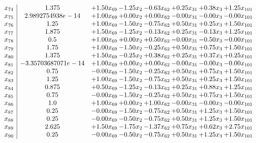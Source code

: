 \documentclass[8pt]{article}
\begin{document}
\[\begin{array}{c| c c@{\hskip 2pt} c@{\hskip 2pt} c@{\hskip 2pt} c@{\hskip 2pt} c@{\hskip 2pt} c@{\hskip 2pt} }
 x_{74}   &  1.375 & +  1.50 x_{69} & -1.25 x_{2} & -0.63 x_{62} & +  0.25 x_{31} & +  0.38 x_{3} & +  1.25 x_{101}\\
 x_{75}   &  2.9892754938e-14 & +  1.00 x_{69} & +  0.00 x_{2} & +  0.00 x_{62} & -0.00 x_{31} & -0.00 x_{3} & -0.00 x_{101}\\
 x_{76}   &  1.25 & +  1.00 x_{69} & -1.50 x_{2} & -0.75 x_{62} & +  0.50 x_{31} & +  0.25 x_{3} & +  1.50 x_{101}\\
 x_{77}   &  1.875 & +  1.50 x_{69} & -1.25 x_{2} & -0.13 x_{62} & +  0.25 x_{31} & -0.13 x_{3} & +  1.25 x_{101}\\
 x_{78}   &  0.5 & +  1.00 x_{69} & +  0.00 x_{2} & +  0.50 x_{62} & -0.00 x_{31} & -0.50 x_{3} & -0.00 x_{101}\\
 x_{79}   &  1.75 & +  1.00 x_{69} & -1.50 x_{2} & -0.25 x_{62} & +  0.50 x_{31} & +  0.75 x_{3} & +  1.50 x_{101}\\
 x_{80}   &  1.375 & +  1.50 x_{69} & -0.25 x_{2} & +  0.38 x_{62} & +  0.25 x_{31} & +  0.37 x_{3} & +  0.25 x_{101}\\
 x_{81}   &  -3.35703687071e-14 & +  1.00 x_{69} & +  0.00 x_{2} & +  0.00 x_{62} & -0.00 x_{31} & -0.00 x_{3} & -0.00 x_{101}\\
 x_{82}   &  0.75 & -0.00 x_{69} & -1.50 x_{2} & -0.25 x_{62} & +  0.50 x_{31} & +  0.75 x_{3} & +  1.50 x_{101}\\
 x_{83}   &  1.25 & +  1.00 x_{69} & -1.50 x_{2} & -0.75 x_{62} & +  0.50 x_{31} & +  0.25 x_{3} & +  1.50 x_{101}\\
 x_{84}   &  0.875 & +  0.50 x_{69} & -1.25 x_{2} & -0.13 x_{62} & +  0.25 x_{31} & +  0.88 x_{3} & +  1.25 x_{101}\\
 x_{85}   &  0.75 & -0.00 x_{69} & -1.50 x_{2} & -0.25 x_{62} & +  0.50 x_{31} & +  0.75 x_{3} & +  1.50 x_{101}\\
 x_{86}   &  1.0 & +  1.00 x_{69} & +  0.00 x_{2} & +  1.00 x_{62} & -0.00 x_{31} & -0.00 x_{3} & -0.00 x_{101}\\
 x_{87}   &  0.25 & -0.00 x_{69} & -1.50 x_{2} & -0.75 x_{62} & +  0.50 x_{31} & +  1.25 x_{3} & +  1.50 x_{101}\\
 x_{88}   &  0.25 & -0.00 x_{69} & -0.50 x_{2} & -0.75 x_{62} & +  0.50 x_{31} & +  1.25 x_{3} & +  1.50 x_{101}\\
 x_{89}   &  2.625 & +  1.50 x_{69} & -1.75 x_{2} & -1.37 x_{62} & +  0.75 x_{31} & +  0.62 x_{3} & +  2.75 x_{101}\\
 x_{90}   &  0.25 & -0.00 x_{69} & -0.50 x_{2} & -0.75 x_{62} & +  0.50 x_{31} & +  1.25 x_{3} & +  1.50 x_{101}\\

\end{array}\]
\end{document}
